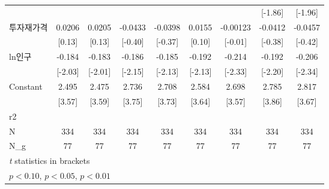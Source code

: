 \begin{tabular}{l*{8}{c}}
                    &                     &                     &                     &                     &                     &                     &     [-1.86]         &     [-1.96]         \\
\addlinespace
투자재가격        &      0.0206         &      0.0205         &     -0.0433         &     -0.0398         &      0.0155         &    -0.00123         &     -0.0412         &     -0.0457         \\
                    &      [0.13]         &      [0.13]         &     [-0.40]         &     [-0.37]         &      [0.10]         &     [-0.01]         &     [-0.38]         &     [-0.42]         \\
\addlinespace
ln인구            &      -0.184\sym{**} &      -0.183\sym{**} &      -0.186\sym{**} &      -0.185\sym{**} &      -0.192\sym{**} &      -0.214\sym{**} &      -0.192\sym{**} &      -0.206\sym{**} \\
                    &     [-2.03]         &     [-2.01]         &     [-2.15]         &     [-2.13]         &     [-2.13]         &     [-2.33]         &     [-2.20]         &     [-2.34]         \\
\addlinespace
Constant            &       2.495\sym{***}&       2.475\sym{***}&       2.736\sym{***}&       2.708\sym{***}&       2.584\sym{***}&       2.698\sym{***}&       2.785\sym{***}&       2.817\sym{***}\\
                    &      [3.57]         &      [3.59]         &      [3.75]         &      [3.73]         &      [3.64]         &      [3.57]         &      [3.86]         &      [3.67]         \\
\midrule
r2                  &                     &                     &                     &                     &                     &                     &                     &                     \\
N                   &         334         &         334         &         334         &         334         &         334         &         334         &         334         &         334         \\
N\_g                 &          77         &          77         &          77         &          77         &          77         &          77         &          77         &          77         \\
\bottomrule
\multicolumn{9}{l}{\footnotesize \textit{t} statistics in brackets}\\
\multicolumn{9}{l}{\footnotesize \sym{*} \(p<0.10\), \sym{**} \(p<0.05\), \sym{***} \(p<0.01\)}\\
\end{tabular}